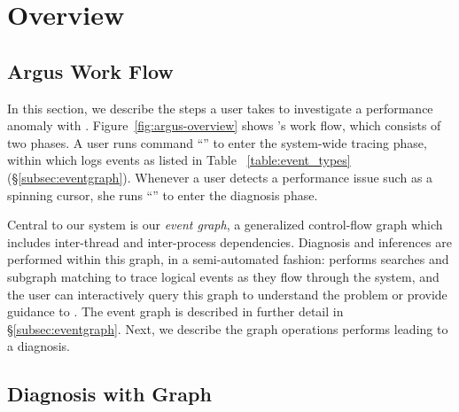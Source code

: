\section{Overview} \label{sec:overview}

\subsection{Argus Work Flow}
\begin{figure*}[tb]
    \centering
    
    \caption{\xxx Work Flow}
    \label{fig:argus-overview}
\end{figure*}

In this section, we describe the steps a user takes to investigate a performance
anomaly with \xxx. Figure~\ref{fig:argus-overview} shows \xxx's work flow,
which consists of two phases. A user runs command ``'' to enter
the system-wide tracing phase, within which \xxx logs events as listed in Table
~\ref{table:event_types} (\S\ref{subsec:eventgraph}). Whenever a user detects
a performance issue such as a spinning cursor, she runs ``'' to
enter the diagnosis phase.


Central to our system is our \emph{event graph}, a generalized control-flow
graph which includes inter-thread and inter-process dependencies. Diagnosis
and inferences are performed within this graph, in a semi-automated fashion:
\xxx performs searches and subgraph matching to trace logical events as they
flow through the system, and the user can interactively query this graph to
understand the problem or provide guidance to \xxx. The event graph is
described in further detail in \S\ref{subsec:eventgraph}. Next, we describe the
graph operations \xxx performs leading to a diagnosis.

\subsection{Diagnosis with Graph} \label{subsec:debug}

